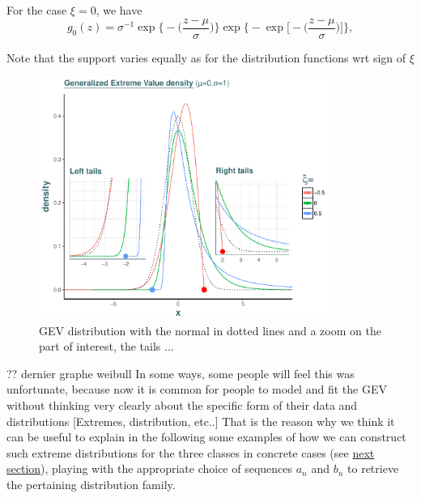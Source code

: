 \documentclass[11pt,a4paper,openany ]{book}
\begin{document}
For the case $\xi=0$, we have 
\begin{equation} \label{gevdensxi0}
g_0(z)= \sigma^{-1}\exp\bigg\{-\bigg(\frac{z-\mu}{\sigma}\bigg)\bigg\}\exp\Bigg\{-\exp\bigg[-\bigg(\frac{z-\mu}{\sigma}\bigg)\bigg]\Bigg\},
\end{equation}

Note that the support varies equally as for the distribution functions wrt sign of $\xi$


\begin{figure}
	\includegraphics[width=0.85\textwidth, height = 0.7\linewidth]{gev3.pdf}\caption{GEV distribution with the normal in dotted lines and a zoom on the part of interest, the tails  ...}\label{gev3plot}
\end{figure}




?? dernier graphe weibull
\newline
In some ways, some people will feel this was unfortunate, because now it is common for
people to model and fit the GEV without thinking very clearly about the
specific form of their data and distributions [Extremes, distribution, etc..] That is the 
reason why we think it can be useful to explain in the following some examples of how we 
can construct such extreme distributions for the three classes in concrete cases (see 
\hyperref[sec::appconcrete]{next section}), playing with the appropriate choice of 
sequences 
$a_n$ and $b_n$ to retrieve the pertaining distribution family.
\end{document}

